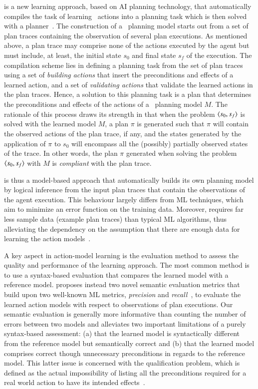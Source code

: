 \textcolor[rgb]{1.00,0.00,0.00}{\FAMA is a new learning approach, based on AI planning technology, that automatically compiles the task of learning \strips\ actions into a planning task which is then solved with a planner~\cite{aineto2018learning}. The construction of a \strips\ planning model starts out from a set of plan traces containing the observation of several plan executions. As mentioned above, a plan trace may comprise none of the actions executed by the agent but must include, at least, the initial state $s_0$ and final state $s_f$ of the execution. The compilation scheme lies in defining a planning task from the set of plan traces using a set of \emph{building actions} that insert the preconditions and effects of a learned action, and a set of \emph{validating actions} that validate the learned actions in the plan traces. Hence, a solution to this planning task is a plan that determines the preconditions and effects of the actions of a \strips\ planning model $M$. The rationale of this process draws its strength in that when the problem ${\langle s_0,s_f \rangle}$ is solved with the learned model $M$, a plan $\pi$ is generated such that $\pi$ will contain the observed actions of the plan trace, if any, and the states generated by the application of $\pi$ to $s_0$ will encompass all the (possibly) partially observed states of the trace. In other words, the plan $\pi$ generated when solving the problem ${\langle s_0,s_f \rangle}$ with $M$ is \emph{compliant} with the plan trace.}

\FAMA is thus a model-based approach that automatically builds its own planning model by logical inference from the input plan traces that contain the observations of the agent execution. This behaviour largely differs from ML techniques, which aim to minimize an error function on the training data. Moreover, \FAMA requires far less sample data (example plan traces) than typical ML algorithms, thus alleviating the dependency on the assumption that there are enough data for learning the action models~\cite{Zhuo15}.

A key aspect in action-model learning is the evaluation method to assess the quality and performance of the learning approach. The most common method is to use a syntax-based evaluation that compares the learned model with a reference model. \FAMA proposes instead two novel semantic evaluation metrics that build upon two well-known ML metrics, {\em precision} and {\em recall}~\cite{davis2006relationship}, to evaluate the learned action models with respect to observations of plan executions. Our semantic evaluation is generally more informative than counting the number of errors between two models and alleviates two important limitations of a purely syntax-based assessment: (a) that the learned model is syntactically different from the reference model but semantically correct and (b) that the learned model comprises correct though unnecessary preconditions in regards to the reference model. This latter issue is concerned with the qualification problem, which is defined as the actual impossibility of listing all the preconditions required for a real world action to have its intended effects~\cite{GinsbergS88}.

